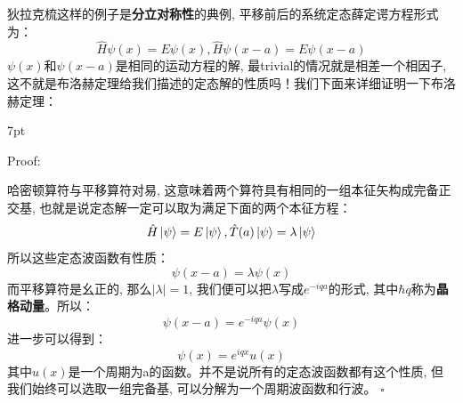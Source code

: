 \documentclass[a4paper,zihao=-4,linespread=1]{ctexrep}
\newenvironment{thinknote}{%
\def\FrameCommand{%
\hspace{1pt}%
{\color{BurlyWood}\vrule width 2pt}%
{\color{formalshade}\vrule width 4pt}%
\colorbox{formalshade}%
}%
\MakeFramed{\advance\hsize-\width\FrameRestore}%
\noindent\hspace{-4.55pt}%
\begin{adjustwidth}{}{7pt}%
\vspace{2pt}\vspace{2pt}%
}
{%
\vspace{2pt}\end{adjustwidth}\endMakeFramed%
}
\begin{document}
    狄拉克梳这样的例子是\textbf{分立对称性}的典例, 平移前后的系统定态薛定谔方程形式为：
    $$\hat{H}\psi(x)=E\psi(x),\hat{H}\psi(x-a)=E\psi(x-a)$$
    $\psi(x)$和$\psi(x-a)$是相同的运动方程的解, 最trivial的情况就是相差一个相因子, 这不就是布洛赫定理给我们描述的定态解的性质吗！我们下面来详细证明一下布洛赫定理：
    \begin{thinknote}
        Proof:
        
        \setlength\parindent{2em}哈密顿算符与平移算符对易, 这意味着两个算符具有相同的一组本征矢构成完备正交基, 也就是说定态解一定可以取为满足下面的两个本征方程：
        $$\hat{H}\ket{\psi}=E\ket{\psi},\hat{T}(a)\ket{\psi}=\lambda\ket{\psi}$$
        所以这些定态波函数有性质：
        $$\psi(x-a)=\lambda\psi(x)$$
        而平移算符是幺正的, 那么$|\lambda|=1$, 我们便可以把$\lambda$写成$e^{-iqa}$的形式, 其中$\hbar q$称为\textbf{晶格动量}。所以：
        $$\psi(x-a)=e^{-iqa}\psi(x)$$
        进一步可以得到：
        \begin{equation}
            \boxed{\psi(x)=e^{iqx}u(x)}
        \end{equation}
        其中$u(x)$是一个周期为a的函数。并不是说所有的定态波函数都有这个性质, 但我们始终可以选取一组完备基, 可以分解为一个周期波函数和行波。 
        \hfill $\square$\par
    \end{thinknote}
\end{document}

